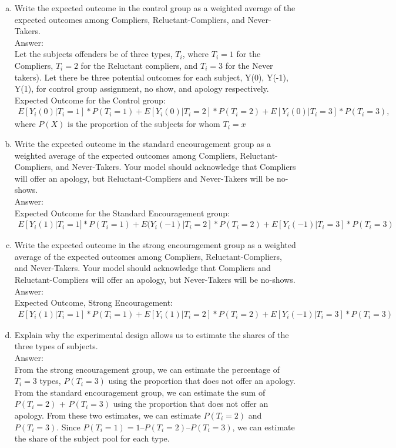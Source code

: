 \documentclass[11pt,notitlepage]{article}\usepackage[]{graphicx}\usepackage[]{color}
\begin{document}
\begin{enumerate}[a)]
\item Write the expected outcome in the control group as a weighted average of the expected outcomes among Compliers, Reluctant-Compliers, and Never-Takers.\\
Answer:\\
Let the subjects offenders be of three types, $T_i$, where $T_i=1$ for the Compliers, $T_i=2$ for the Reluctant compliers, and $T_i=3$ for the Never takers).  Let there be three potential outcomes for each subject, Y(0), Y(-1), Y(1), for control group assignment, no show, and apology respectively. 
Expected Outcome for the Control group: 
\begin{align*}
E[Y_i(0)|T_i=1]*P(T_i=1)+E[Y_i(0)|T_i=2]*P(T_i=2)+E[Y_i(0)|T_i=3]*P(T_i=3) ,
\end{align*}
where $P(X)$ is the proportion of the subjects for whom $T_i=x$

\item Write the expected outcome in the standard encouragement group as a weighted average of the expected outcomes among Compliers, Reluctant-Compliers, and Never-Takers. Your model should acknowledge that Compliers will offer an apology, but Reluctant-Compliers and Never-Takers will be no-shows.\\
Answer:\\
Expected Outcome for the Standard Encouragement group: 
\begin{align*}
E[Y_i(1)|T_i=1]*P(T_i=1)+E(Y_i(-1)|T_i=2]*P(T_i=2)+E[Y_i(-1)|T_i=3]*P(T_i=3)
\end{align*}

\item Write the expected outcome in the strong encouragement group as a weighted average of the expected outcomes among Compliers, Reluctant-Compliers, and Never-Takers. Your model should acknowledge that Compliers and Reluctant-Compliers will offer an apology, but Never-Takers will be no-shows.\\
Answer:\\
Expected Outcome, Strong Encouragement: 
\begin{align*}
E[Y_i(1)|T_i=1]*P(T_i=1)+E[Y_i(1)|T_i=2]*P(T_i=2)+E[Y_i(-1)|T_i=3]*P(T_i=3)
\end{align*}

\item Explain why the experimental design allows us to estimate the shares of the three types of subjects.\\
Answer:\\
From the strong encouragement group, we can estimate the percentage of $T_i=3$ types, $P(T_i=3)$ using the proportion that does not offer an apology. From the standard encouragement group, we can estimate the sum of $P(T_i=2)$ + $P(T_i=3)$ using the proportion that does not offer an apology. From these two estimates, we can estimate $P(T_i=2)$ and $P(T_i=3)$. Since $P(T_i=1) = 1 – P(T_i=2) – P(T_i=3)$, we can estimate the share of the subject pool for each type.  


\end{enumerate}
\end{document}
